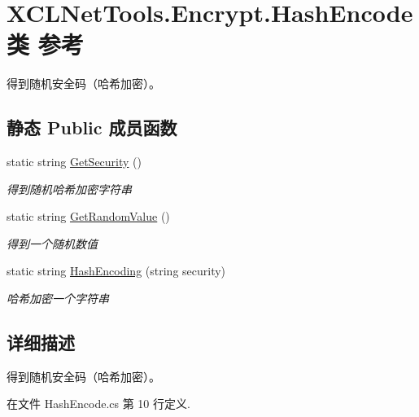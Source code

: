 \hypertarget{class_x_c_l_net_tools_1_1_encrypt_1_1_hash_encode}{\section{X\-C\-L\-Net\-Tools.\-Encrypt.\-Hash\-Encode类 参考}
\label{class_x_c_l_net_tools_1_1_encrypt_1_1_hash_encode}
}


得到随机安全码（哈希加密）。  


\subsection*{静态 Public 成员函数}
\begin{DoxyCompactItemize}
\item 
static string \hyperlink{class_x_c_l_net_tools_1_1_encrypt_1_1_hash_encode_aa9bb322a56c4ccb43846364c342286ab}{Get\-Security} ()
\begin{DoxyCompactList}\small\item\em 得到随机哈希加密字符串 \end{DoxyCompactList}\item 
static string \hyperlink{class_x_c_l_net_tools_1_1_encrypt_1_1_hash_encode_a2b9a5aeb95feb8b89aa9251945948599}{Get\-Random\-Value} ()
\begin{DoxyCompactList}\small\item\em 得到一个随机数值 \end{DoxyCompactList}\item 
static string \hyperlink{class_x_c_l_net_tools_1_1_encrypt_1_1_hash_encode_a274d0413fc6c3ce6ba24300fab20fee8}{Hash\-Encoding} (string security)
\begin{DoxyCompactList}\small\item\em 哈希加密一个字符串 \end{DoxyCompactList}\end{DoxyCompactItemize}


\subsection{详细描述}
得到随机安全码（哈希加密）。 



在文件 Hash\-Encode.\-cs 第 10 行定义.



